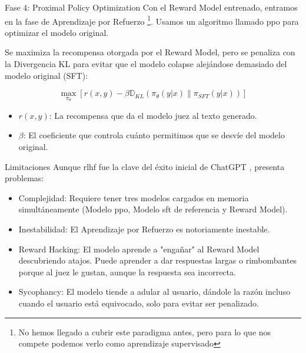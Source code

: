 \begin{frame}{Fase 4: Proximal Policy Optimization}
Con el Reward Model entrenado, entramos en la fase de Aprendizaje por Refuerzo \footnote{No hemos llegado a cubrir este paradigma antes, pero para lo que nos compete podemos verlo como aprendizaje supervisado}. Usamos un algoritmo llamado \alert{\gls{ppo}} \cite{schulman2017proximal} para optimizar el modelo original.

Se maximiza la \alert{recompensa} otorgada por el Reward Model, pero se penaliza con la \alert{Divergencia KL} para evitar que el modelo colapse alejándose demasiado del modelo original (SFT):

\begin{equation}
\max_{\pi_\theta} \left[ r(x, y) - \beta \mathbb{D}_{KL} (\pi_\theta(y|x) \parallel \pi_{SFT}(y|x)) \right]
\end{equation}

\begin{itemize}
    \item \alert{$r(x, y)$}: La \alert{recompensa} que da el modelo juez al texto generado.
    \item \alert{$\beta$}: El \alert{coeficiente} que controla cuánto permitimos que se desvíe del modelo original.
\end{itemize}
\end{frame}

\begin{frame}{Limitaciones}
Aunque \gls{rlhf} fue la \alert{clave del éxito} inicial de ChatGPT \cite{zheng2023secrets}, presenta problemas:

\begin{itemize}
    \item \alert{Complejidad:} Requiere tener tres modelos cargados en memoria simultáneamente (Modelo \gls{ppo}, Modelo \gls{sft} de referencia y Reward Model).
    \item \alert{Inestabilidad:} El Aprendizaje por Refuerzo es notoriamente inestable.
    \item \alert{Reward Hacking:} El modelo aprende a "engañar" al Reward Model descubriendo atajos. Puede aprender a dar respuestas largas o rimbombantes porque al juez le gustan, aunque la respuesta sea incorrecta.
    \item \alert{Sycophancy:} El modelo tiende a adular al usuario, dándole la razón incluso cuando el usuario está equivocado, solo para evitar ser penalizado.
\end{itemize}
\end{frame}

